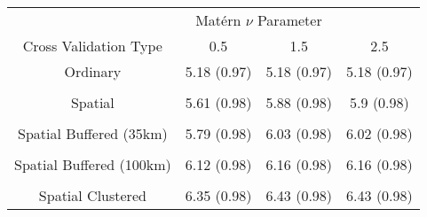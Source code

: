 
\begin{tabular}{cccc}
\toprule
\multicolumn{1}{c}{ } & \multicolumn{2}{c}{Mat\'{e}rn $\nu$ Parameter} \\
\cmidrule(l{3pt}r{3pt}){2-3}
Cross Validation Type & 0.5 & 1.5 & 2.5\\
\midrule
Ordinary & 5.18 (0.97) & 5.18 (0.97) & 5.18 (0.97)\\
\\[-3.0ex]
Spatial & 5.61 (0.98) & 5.88 (0.98) & 5.9 (0.98)\\
\\[-3.0ex]
Spatial Buffered (35km) & 5.79 (0.98) & 6.03 (0.98) & 6.02 (0.98)\\
\\[-3.0ex]
Spatial Buffered (100km) & 6.12 (0.98) & 6.16 (0.98) & 6.16 (0.98)\\
\\[-3.0ex]
Spatial Clustered & 6.35 (0.98) & 6.43 (0.98) & 6.43 (0.98)\\
\bottomrule
\end{tabular}
